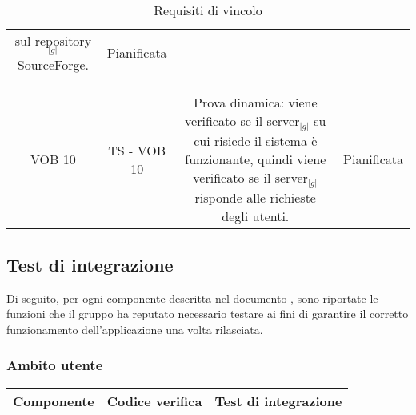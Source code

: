 {{\begin{table}[h!]
\begin{center}
\begin{minipage}{1\linewidth}
\begin{tabular}{c c c c}
\begin{minipage}{0.55\linewidth}
							sul repository$_{|g|}$ SourceForge.
						\end{minipage}	
						&
						Pianificata
						\\
						\\  
						\bottomrule
						\\\\
						VOB 10
						&
						TS - VOB 10
						&
						\begin{minipage}{0.55\linewidth}
							Prova dinamica: viene verificato se il server$_{|g|}$ su cui risiede il sistema è 
							funzionante, quindi viene verificato se il server$_{|g|}$ risponde alle richieste degli utenti.
						\end{minipage}	
						&
						Pianificata
						\\  
						\bottomrule
						\end{tabular}
					\end{minipage}
				
			\end{center}	
			\caption{Requisiti di vincolo}
		\end{table}
	}

	\newpage

	\newpage

	\subsection{Test di integrazione}{
		\label{sec:testI}
		Di seguito, per ogni componente descritta nel documento \textit{\SpecificaTecnica}, 
		sono riportate le funzioni che il gruppo ha reputato necessario testare ai fini di 
		garantire il corretto funzionamento dell’applicazione una volta rilasciata.\\
		
		\subsubsection{Ambito utente}
		\begin{table}[h!]
				\begin{center}
				\scriptsize
						\begin{minipage}{1\linewidth}
							\begin{tabular}{c c c}				
							\toprule
								Componente & Codice verifica & Test di integrazione \\ 
							\midrule	
							

\end{tabular}
\end{minipage}
\end{center}
\end{table}}}
